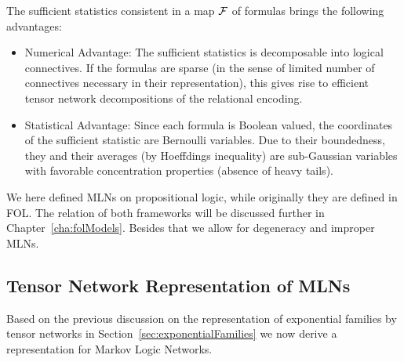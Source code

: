 

The sufficient statistics consistent in a map $\mathcal{F}$ of formulas brings the following advantages:
\begin{itemize}
	\item Numerical Advantage: The sufficient statistics is decomposable into logical connectives. 
	If the formulas are sparse (in the sense of limited number of connectives necessary in their representation), this gives rise to efficient tensor network decompositions of the relational encoding.
	\item Statistical Advantage: Since each formula is Boolean valued, the coordinates of the sufficient statistic are Bernoulli variables. 
	Due to their boundedness, they and their averages (by Hoeffdings inequality) are sub-Gaussian variables with favorable concentration properties (absence of heavy tails).
\end{itemize}


\begin{remark}
	We here defined MLNs on propositional logic, while originally they are defined in FOL.
	The relation of both frameworks will be discussed further in Chapter~\ref{cha:folModels}.
	Besides that we allow for degeneracy and improper MLNs.
\end{remark}








\subsection{Tensor Network Representation of MLNs}

Based on the previous discussion on the representation of exponential families by tensor networks in Section~\ref{sec:exponentialFamilies} we now derive a representation for Markov Logic Networks.

